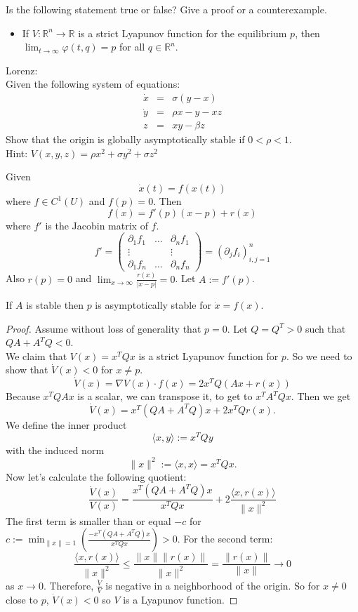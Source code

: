 \documentclass{article}
\newcommand*{\R}{\mathbb{R}}
\newcommand*{\jbr}[1]{{\langle #1 \rangle}}
\newcommand*{\matthree}[9]{\begin{pmatrix}
    #1&#2&#3\\#4&#5&#6\\#7&#8&#9
\end{pmatrix}}
\begin{document}
\begin{hw}
    Is the following statement true or false? Give a proof or a counterexample.
    \begin{itemize}
        \item If $V:\R^n\to\R$ is a strict Lyapunov function for the equilibrium $p$, then $\lim_{t\to\infty} \varphi(t,q) = p$ for all $q \in\R^n$.\\
    \end{itemize}
\end{hw}

\begin{hw}
    Lorenz:\\
    Given the following system of equations:
    $$\begin{array}{rcl}\dot x&=&\sigma(y-x)\\
    \dot y &=& \rho x-y-xz\\
    z &=& xy-\beta z\end{array}$$
    Show that the origin is globally asymptotically stable if $0<\rho < 1$.\\
    Hint: $V(x,y,z) = \rho x^2+\sigma y^2+\sigma z^2$
\end{hw}

Given
$$\dot x(t)=f(x(t))$$
where $f \in C^1(U)$ and $f(p) = 0$. Then
$$f(x)=f'(p)(x-p)+r(x)$$
where $f'$ is the Jacobin matrix of $f$.
$$f'=\matthree{\partial_1f_1}{\dots}{\partial_nf_1}{\vdots}{}{\vdots}{\partial_1f_n}{\dots}{\partial_nf_n}=(\partial_jf_i)_{i,j=1}^n$$
Also $r(p) = 0$ and $\lim_{x\to\infty}\frac{r(x)}{|x-p|}=0$. Let $A := f'(p)$.
\begin{thm}
    If $A$ is stable then $p$ is asymptotically stable for $\dot x=f(x)$.
\end{thm}

\begin{proof}
    Assume without loss of generality that $p=0$. Let $Q = Q^T > 0$ such that $QA+A^TQ<0$.\\
    We claim that $V(x)=x^TQx$ is a strict Lyapunov function for $p$. So we need to show that $\dot V(x) < 0$ for $x \neq p$.\\
    $$\dot V(x) = \nabla V(x)\cdot f(x)=2x^TQ (Ax+r(x))$$
    Because $x^TQAx$ is a scalar, we can transpose it, to get to $x^TA^TQx$. Then we get
    $$\dot V(x) = x^T(QA+A^TQ)x + 2x^T Q r(x).$$
    We define the inner product
    $$\jbr{x,y}:=x^TQy$$
    with the induced norm
    $$\|x\|^2 := \jbr{x,x}=x^TQx.$$
    Now let's calculate the following quotient:
    $$\frac{\dot V(x)}{V(x)}=\frac{x^T(QA+A^TQ)x}{x^TQx}+2\frac{\jbr{x,r(x)}}{\|x\|^2}$$
    The first term is smaller than or equal $-c$ for $c := \min_{\|x\|=1}\left(\frac{-x^T(QA+A^TQ)x}{x^TQx}\right)>0$. For the second term:
    $$\frac{\jbr{x,r(x)}}{\|x\|^2}\leq \frac{\|x\|\|r(x)\|}{\|x\|^2} = \frac{\|r(x)\|}{\|x\|} \to 0$$
    as $x \to 0$. Therefore, $\frac{\dot{V}}{V}$ is negative in a neighborhood of the origin. So for $x \neq 0$ close to $p$, $\dot V(x) < 0$ so $V$ is a Lyapunov function.
\end{proof}
\end{document}
